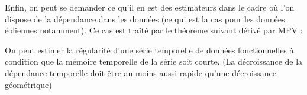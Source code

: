 Enfin, on peut se demander ce qu'il en est des estimateurs dans le cadre où l'on dispose de la dépendance dans les données (ce qui est la cas pour les données éoliennes notamment). Ce cas est traîté par le théorème suivant dérivé par MPV :

\begin{thm*}

	On peut estimer la régularité d'une série temporelle de données fonctionnelles à condition que la mémoire temporelle de la série soit courte. (La décroissance de la dépendance temporelle doit être au moins aussi rapide qu'une décroissance géométrique)

	\label{thm*:far_adaptative_estimation}
\end{thm*}
